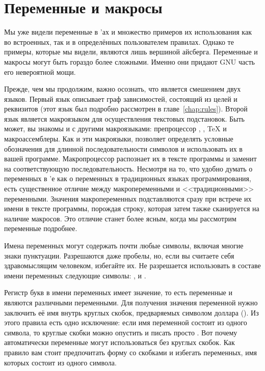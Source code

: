 \chapter{Переменные и макросы}
\label{chap:vars}

Мы уже видели переменные в \Makefile{}'ах и множество примеров их
использования как во встроенных, так и в определённых пользователем
правилах. Однако те примеры, которые мы видели, являются лишь вершиной
айсберга. Переменные и макросы могут быть гораздо более сложными.
Именно они придают GNU \GNUmake{} часть его невероятной мощи.

Прежде, чем мы продолжим, важно осознать, что \GNUmake{} является
смешением двух языков. Первый язык описывает граф зависимостей,
состоящий из целей и реквизитов (этот язык был подробно рассмотрен в
главе~\ref{chap:rules}). Второй язык является макроязыком для
осуществления текстовых подстановок. Быть может, вы знакомы и с
другими макроязыками: препроцессор \Clang{}, , \TeX{} и
макроассемблеры.  Как и эти макроязыки, \GNUmake{} позволяет
определять условные обозначения для длинной последовательности
символов и использовать их в вашей программе. Макропроцессор
распознает их в тексте программы и заменит на соответствующую
последовательность. Несмотря на то, что удобно думать о переменных в
\Makefile{}'е как о переменных в традиционных языках программирования,
есть существенное отличие между макропеременными и <<традиционными>>
переменными. Значения макропеременных подставляются сразу при встрече
их имени в тексте программы, порождая строку, которая затем также
сканируется на наличие макросов. Это отличие станет более ясным, когда
мы рассмотрим переменные \GNUmake{} подробнее.

Имена переменных могут содержать почти любые символы, включая многие
знаки пунктуации. Разрешаются даже пробелы, но, если вы считаете себя
здравомыслящим человеком, избегайте их. Не разрешается использовать в
составе имени переменных следующие символы: \command{:}, \command{\#}
и \command{=}.

Регистр букв в имени переменных имеет значение, то есть переменные
 и  являются различными переменными. Для
получения значения переменной нужно заключить её имя внутрь круглых
скобок, предваряемых символом доллара (\variable{\$( )}). Из этого
правила есть одно исключение: если имя переменной состоит из одного
символа, то круглые скобки можно опустить и писать просто
. Вот почему автоматически переменные
могут использоваться без круглых скобок. Как правило вам стоит
предпочитать форму со скобками и избегать переменных, имя которых
состоит из одного символа.

